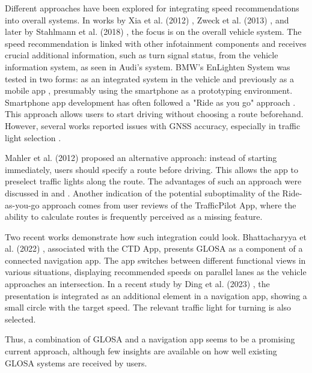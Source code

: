 Different approaches have been explored for integrating speed recommendations into overall systems. In works by Xia et al. (2012) \cite{xia_field_2012}, Zweck et al. (2013) \cite{zweck_traffic_2013}, and later by Stahlmann et al. (2018) \cite{stahlmann_exploring_2018}, the focus is on the overall vehicle system. The speed recommendation is linked with other infotainment components and receives crucial additional information, such as turn signal status, from the vehicle information system, as seen in Audi's system. BMW's EnLighten System was tested in two forms: as an integrated system in the vehicle \cite{sokolov_effects_2018} and previously as a mobile app \cite{wilson_driver_2017}, presumably using the smartphone as a prototyping environment. Smartphone app development has often followed a "Ride as you go" approach \cite{otto_operating_2010, koukoumidis_signalguru_2011, koukoumidis_leveraging_2012, bernais_design_2016, wilson_driver_2017, zhang_green_2020, khan_eco-drive_2021, yunex_traffic_v2x-kommunikation_2023}. This approach allows users to start driving without choosing a route beforehand. However, several works reported issues with GNSS accuracy, especially in traffic light selection \cite{wilson_driver_2017, stahlmann_exploring_2018, bhattacharyya_assessing_2022}.

Mahler et al. (2012) \cite{mahler_reducing_2012} proposed an alternative approach: instead of starting immediately, users should specify a route before driving. This allows the app to preselect traffic lights along the route. The advantages of such an approach were discussed in  and . Another indication of the potential suboptimality of the Ride-as-you-go approach comes from user reviews of the TrafficPilot App, where the ability to calculate routes is frequently perceived as a missing feature.

Two recent works demonstrate how such integration could look. Bhattacharyya et al. (2022) \cite{bhattacharyya_assessing_2022}, associated with the CTD App, presents GLOSA as a component of a connected navigation app. The app switches between different functional views in various situations, displaying recommended speeds on parallel lanes as the vehicle approaches an intersection. In a recent study by Ding et al. (2023) \cite{ding_speedadv_2023}, the presentation is integrated as an additional element in a navigation app, showing a small circle with the target speed. The relevant traffic light for turning is also selected.

Thus, a combination of GLOSA and a navigation app seems to be a promising current approach, although few insights are available on how well existing GLOSA systems are received by users.

